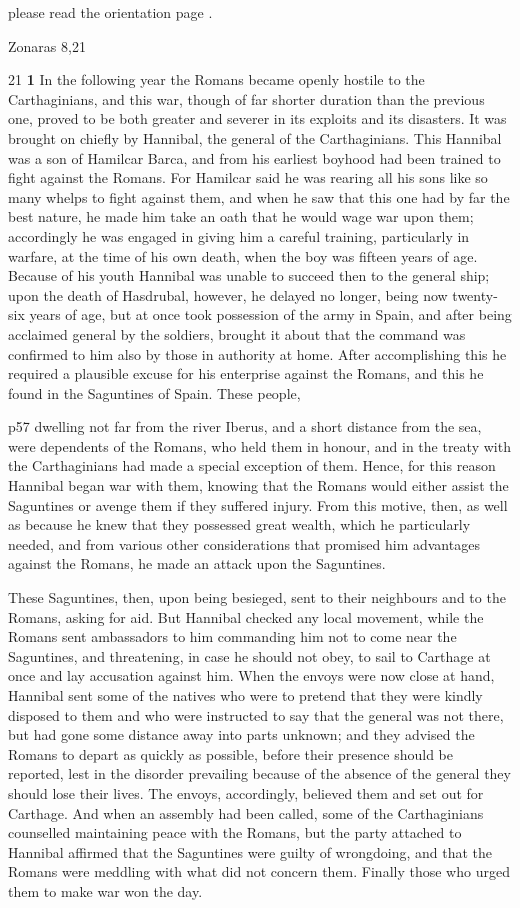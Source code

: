 please read the orientation page .

Zonaras 8,21

21
\textbf{1} In the following year the Romans became openly hostile to the Carthaginians, and this war, though of far shorter duration than the previous one, proved to be both greater and severer in its exploits and its disasters. It was brought on chiefly by Hannibal, the general of the Carthaginians. This Hannibal was a son of Hamilcar Barca, and from his earliest boyhood had been trained to fight against the Romans. For Hamilcar said he was rearing all his sons like so many whelps to fight against them, and when he saw that this one had by far the best nature, he made him take an oath that he would wage war upon them; accordingly he was engaged in giving him a careful training, particularly in warfare, at the time of his own death, when the boy was fifteen years of age. Because of his youth Hannibal was unable to succeed then to the general ­ship; upon the death of Hasdrubal, however, he delayed no longer, being now twenty-six years of age, but at once took possession of the army in Spain, and after being acclaimed general by the soldiers, brought it about that the command was confirmed to him also by those in authority at home. After accomplishing this he required a plausible excuse for his enterprise against the Romans, and this he found in the Saguntines of Spain. These people,

p57 dwelling not far from the river Iberus, and a short distance from the sea, were dependents of the Romans, who held them in honour, and in the treaty with the Carthaginians had made a special exception of them. Hence, for this reason Hannibal began war with them, knowing that the Romans would either assist the Saguntines or avenge them if they suffered injury. From this motive, then, as well as because he knew that they possessed great wealth, which he particularly needed, and from various other considerations that promised him advantages against the Romans, he made an attack upon the Saguntines.

These Saguntines, then, upon being besieged, sent to their neighbours and to the Romans, asking for aid. But Hannibal checked any local movement, while the Romans sent ambassadors to him commanding him not to come near the Saguntines, and threatening, in case he should not obey, to sail to Carthage at once and lay accusation against him. When the envoys were now close at hand, Hannibal sent some of the natives who were to pretend that they were kindly disposed to them and who were instructed to say that the general was not there, but had gone some distance away into parts unknown; and they advised the Romans to depart as quickly as possible, before their presence should be reported, lest in the disorder prevailing because of the absence of the general they should lose their lives. The envoys, accordingly, believed them and set out for Carthage. And when an assembly had been called, some of the Carthaginians counselled maintaining peace with the Romans, but the party attached to Hannibal affirmed that the Saguntines were guilty of wrongdoing, and that the Romans were meddling with what did not concern them. Finally those who urged them to make war won the day.

